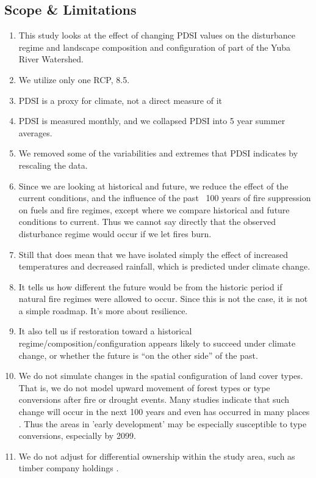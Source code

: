 \documentclass[12pt]{article}
\begin{document}
\begin{spacing}{1}
\subsection*{Scope \& Limitations}
\begin{enumerate}
	\item This study looks at the effect of changing PDSI values on the disturbance regime and landscape composition and configuration of part of the Yuba River Watershed. 
	\item We utilize only one RCP, 8.5.
	\item PDSI is a proxy for climate, not a direct measure of it
	\item PDSI is measured monthly, and we collapsed PDSI into 5 year summer averages.
	\item We removed some of the variabilities and extremes that PDSI indicates by rescaling the data.
	\item Since we are looking at historical and future, we reduce the effect of the current conditions, and the influence of the past ~100 years of fire suppression on fuels and fire regimes, except where we compare historical and future conditions to current. Thus we cannot say directly that the observed disturbance regime would occur if we let fires burn.
	\item Still that does mean that we have isolated simply the effect of increased temperatures and decreased rainfall, which is predicted under climate change.
	\item It tells us how different the future would be from the historic period if natural fire regimes were allowed to occur. Since this is not the case, it is not a simple roadmap. It's more about resilience. 
	\item It also tell us if restoration toward a historical regime/composition/configuration appears likely to succeed under climate change, or whether the future is ``on the other side'' of the past.
	\item We do not simulate changes in the spatial configuration of land cover types. That is, we do not model upward movement of forest types or type conversions after fire or drought events. Many studies indicate that such change will occur in the next 100 years and even has occurred in many places \citep{Bachelet2001}. Thus the areas in 'early development' may be especially susceptible to type conversions, especially by 2099.
	\item We do not adjust for differential ownership within the study area, such as timber company holdings \citep{Nonaka2005}.
\end{enumerate}





\end{spacing}
\end{document}
